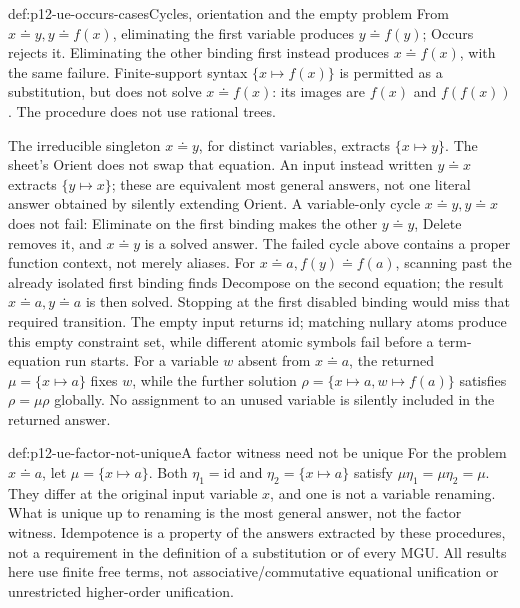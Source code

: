 \begin{hbexample}{def:p12-ue-occurs-cases}{Cycles, orientation and the empty problem}
From \(x\doteq y,y\doteq f(x)\), eliminating the first variable
produces \(y\doteq f(y)\); Occurs rejects it. Eliminating the other
binding first instead produces \(x\doteq f(x)\), with the same failure.
Finite-support syntax \(\{x\mapsto f(x)\}\) is permitted as a
substitution, but does not solve \(x\doteq f(x)\): its images are
\(f(x)\) and \(f(f(x))\). The procedure does not use rational trees.

The irreducible singleton \(x\doteq y\), for distinct variables,
extracts \(\{x\mapsto y\}\). The sheet's Orient does not swap
that equation. An input instead written \(y\doteq x\) extracts
\(\{y\mapsto x\}\); these are equivalent most general answers,
not one literal answer obtained by silently extending Orient.
A variable-only cycle \(x\doteq y,y\doteq x\) does not fail:
Eliminate on the first binding makes the other \(y\doteq y\),
Delete removes it, and \(x\doteq y\) is a solved answer. The failed
cycle above contains a proper function context, not merely aliases.
For \(x\doteq a,f(y)\doteq f(a)\), scanning past the already
isolated first binding finds Decompose on the second equation; the
result \(x\doteq a,y\doteq a\) is then solved. Stopping at the
first disabled binding would miss that required transition.
The empty input returns \(\mathrm{id}\); matching nullary atoms
produce this empty constraint set, while different atomic symbols
fail before a term-equation run starts.
For a variable \(w\) absent from \(x\doteq a\), the returned
\(\mu=\{x\mapsto a\}\) fixes \(w\), while the further solution
\(\rho=\{x\mapsto a,w\mapsto f(a)\}\) satisfies
\(\rho=\mu\rho\) globally. No assignment to an unused variable is
silently included in the returned answer.
\end{hbexample}

\begin{hbwarning}{def:p12-ue-factor-not-unique}{A factor witness need not be unique}
For the problem \(x\doteq a\), let \(\mu=\{x\mapsto a\}\).
Both \(\eta_1=\mathrm{id}\) and \(\eta_2=\{x\mapsto a\}\)
satisfy \(\mu\eta_1=\mu\eta_2=\mu\). They differ at the original
input variable \(x\), and one is not a variable renaming. What is
unique up to renaming is the most general answer, not the factor witness.
Idempotence is a property of the answers extracted by these procedures,
not a requirement in the definition of a substitution or of every MGU.
All results here use finite free terms, not associative/commutative
equational unification or unrestricted higher-order unification.
\end{hbwarning}


